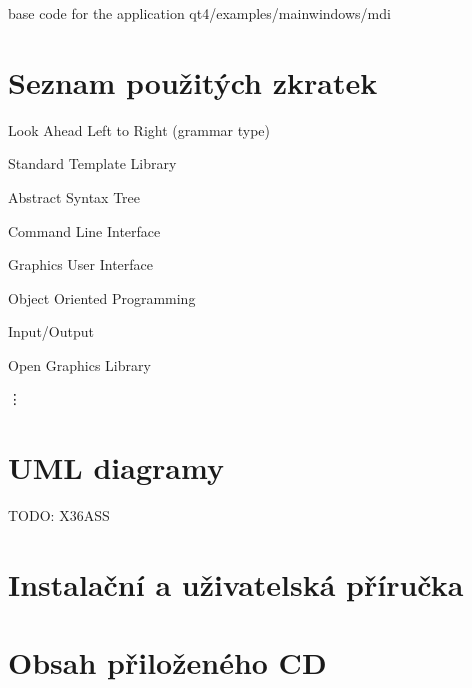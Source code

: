 \documentclass[11pt,twoside,a4paper]{book}
\begin{document}
base code for the application qt4/examples/mainwindows/mdi



\chapter{Seznam použitých zkratek}
\begin{description}
\setlength{\labelwidth}{2.5cm}
\setlength{\itemindent}{1.5cm}
\item[LALR] Look Ahead Left to Right (grammar type)
\item[STL] Standard Template Library
\item[AST] Abstract Syntax Tree
\item[CLI] Command Line Interface
\item[GUI] Graphics User Interface
\item[OOP] Object Oriented Programming
\item[I/O] Input/Output
\item[OpenGL] Open Graphics Library
\end{description}
\vdots



\chapter{UML diagramy}

TODO: X36ASS



\chapter{Instalační a uživatelská příručka}



\chapter{Obsah přiloženého CD}
\end{document}
